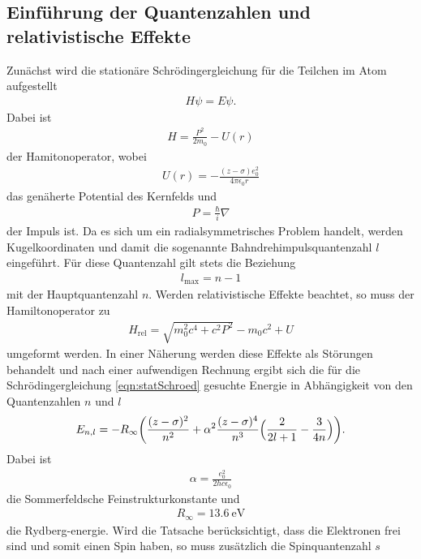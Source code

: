 \subsection{Einführung der Quantenzahlen und relativistische Effekte}

Zunächst wird die stationäre Schrödingergleichung für die Teilchen im Atom
aufgestellt
\begin{align}
  H \psi = E \psi.
  \label{eqn:statSchroed}
\end{align}
Dabei ist
\begin{align}
  H = \frac{P^2}{2 m_0} - U(r)
\end{align}
der Hamitonoperator, wobei
\begin{align}
  U(r) = - \frac{(z-\sigma) e_0^2}{4 \pi \epsilon_0 r}
\end{align}
das genäherte Potential des Kernfelds und
\begin{align}
  P = \frac{\hbar}{i} \nabla
\end{align}
der Impuls ist.
Da es sich um ein radialsymmetrisches Problem handelt, werden Kugelkoordinaten
und damit die sogenannte Bahndrehimpulsquantenzahl $l$ eingeführt. Für diese
Quantenzahl gilt stets die Beziehung
\begin{align}
  l_\text{max} = n-1
\end{align}
mit der Hauptquantenzahl $n$.
Werden relativistische Effekte beachtet, so muss der Hamiltonoperator zu
\begin{align}
  H_\text{rel} = \sqrt{m_0^2 c^4 + c^2 P^2} - m_0 c^2 + U
\end{align}
umgeformt werden. In einer Näherung werden diese Effekte als Störungen
behandelt und nach einer aufwendigen Rechnung ergibt sich die für die
Schrödingergleichung \eqref{eqn:statSchroed} gesuchte Energie in Abhängigkeit
von den Quantenzahlen $n$ und $l$
\begin{align}
  E_{n,l} = -R_\infty \biggl(\frac{(z-\sigma)^2}{n^2} + \alpha^2 \frac{(z-\sigma)^4}{n^3}
  \Bigl(\frac{2}{2l+1} - \frac{3}{4n}\Bigr) \biggr).
\end{align}
Dabei ist
\begin{align}
  \alpha = \frac{e_0^2}{2 h c \epsilon_0}
\end{align}
die Sommerfeldsche Feinstrukturkonstante und
\begin{align}
  R_\infty = \SI{13.6}{\electronvolt}
\end{align}
die Rydberg-energie.
Wird die Tatsache berücksichtigt, dass die Elektronen frei sind und somit einen
Spin haben, so muss zusätzlich die Spinquantenzahl $s$
